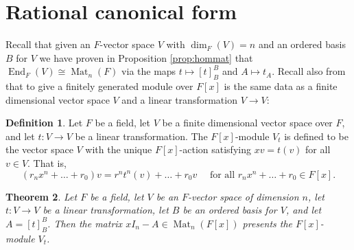 \documentclass[12pt]{report}
\newtheorem{theorem}{Theorem}[chapter]
\numberwithin{equation}{section}
\numberwithin{theorem}{chapter}
\theoremstyle{definition}
\newtheorem{definition}[theorem]{Definition}
\newtheorem*{basic properties}{Basic Properties}
\newtheorem*{Important Remark}{Important Remark}
\DeclareMathOperator{\End}{End}
\DeclareMathOperator{\M}{Mat}
\begin{document}
\section{Rational canonical form}

 Recall that given an $F$-vector space $V$ with $\dim_F(V)=n$ and an ordered basis $B$ for $V$ we have proven in Proposition \ref{prop:hommat} that $\End_F(V)\cong \M_n(F)$ via the maps $t\mapsto [t]_B^B$ and $A\mapsto t_A$.
Recall also from  that to give a finitely generated module over $F[x]$ is the same data as a finite dimensional vector space $V$ and a linear transformation $V \to V$:
 
\begin{definition} 
Let $F$ be a field, let $V$ be a finite dimensional vector space over $F$, and let $t: V \to V$ be a linear transformation. The $F[x]$-module $V_t$ is defined to be the vector space $V$ with the unique $F[x]$-action satisfying $xv = t(v)$ for all $v \in V$. That is, 
$$(r_nx^n + \dots+ r_0)v = r^nt^n(v) + \dots + r_0v \quad \text{ for all } r_nx^n + \dots + r_0 \in F[x].$$
\end{definition}
 
\begin{theorem}\label{presents F[x] module}
Let $F$ be a field, let $V$ be an $F$-vector space of dimension $n$, let $t\!: V \to V$ be a linear transformation, let $B$ be an ordered basis for $V$, and let $A = [t]_B^B$. Then the matrix $xI_n - A \in \M_n(F[x])$ presents the $F[x]$-module $V_t$.
\end{theorem}
\end{document}
